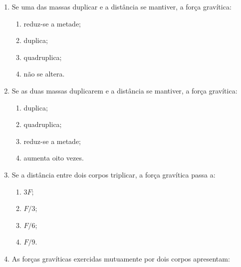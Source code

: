 \documentclass[11pt,a4paper]{article}
\begin{document}
	\begin{enumerate}[label=\textbf{\arabic*.},resume]
		
		\item Se uma das massas duplicar e a distância se mantiver, a força
		gravítica:
		
		\begin{enumerate}[label=\Alph*.]
			
			\item reduz-se a metade;
			
			\item duplica;
			
			\item quadruplica;
			
			\item não se altera.
			
		\end{enumerate}
		
		\item Se as duas massas duplicarem e a distância se mantiver, a força
		gravítica:
		
		\begin{enumerate}[label=\Alph*.]
			
			\item duplica;
			
			\item quadruplica;
			
			\item reduz-se a metade;
			
			\item aumenta oito vezes.
			
		\end{enumerate}
		
		\item Se a distância entre dois corpos triplicar, a força gravítica passa
		a:
		
		\begin{enumerate}[label=\Alph*.]
			
			\item $3F$;
			
			\item $F/3$;
			
			\item $F/6$;
			
			\item $F/9$.
			
		\end{enumerate}
		
		\item As forças gravíticas exercidas mutuamente por dois corpos apresentam:
		

\end{enumerate}
\end{document}
